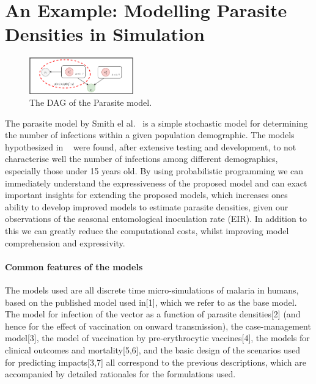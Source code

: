 \documentclass{article}
\begin{document}
\section{An Example: Modelling Parasite Densities in Simulation}
  \begin{figure}[h!]
    \centering
    \label{fig:parasite}
    \includegraphics[width=0.4\textwidth]{parasite_model.pdf}
    \caption{The DAG of the Parasite model.}
  \end{figure}
The parasite model by Smith el al.~\cite{smith2006relationship} is a simple stochastic 
model for determining the number of infections within a given population demographic.
The models hypothesized in ~\cite{smith2006relationship} were found, 
after extensive testing and development, to not characterise well the number 
of infections among different demographics, especially those under 15 years old. 
By using probabilistic programming we can immediately understand 
the expressiveness of the proposed model and can exact important insights for 
extending the proposed models, which increases ones ability to develop 
improved models to estimate parasite densities, given 
our observations of the seasonal entomological inoculation rate (EIR).
In addition to this we can greatly reduce the computational costs, whilst
improving model comprehension and expressivity.  


\paragraph{Common features of the models}
The models used are all discrete time micro-simulations of malaria in humans, 
based on the published model used in[1], which we refer to as the base model.
The model for infection of the vector as a function of parasite densities[2] 
(and hence for the effect of vaccination on onward transmission), the case-management model[3], 
the model of vaccination by pre-erythrocytic vaccines[4], the models for clinical outcomes and mortality[5,6], 
and the basic design of the scenarios used for predicting impacts[3,7] all correspond to the previous descriptions,
 which are accompanied by detailed rationales for the formulations used.  
\end{document}
